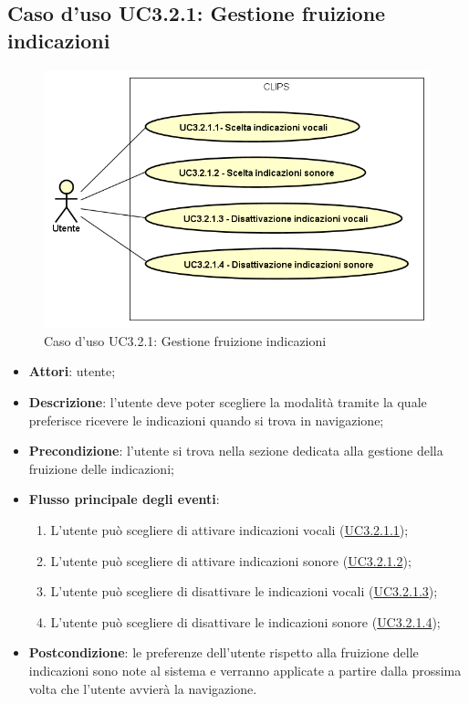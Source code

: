 \documentclass[../AnalisiDeiRequisiti.tex]{subfiles}
\begin{document}
\subsection{Caso d'uso UC3.2.1: Gestione fruizione indicazioni}

        \begin{figure}[H]
            \centering
            \includegraphics[scale=0.95, width=\textwidth]{img/UC3-2-1.png}
            \caption{Caso d'uso UC3.2.1: Gestione fruizione indicazioni}\label{fig:UC3.2.1} 
        \end{figure}
\begin{itemize}
\item \textbf{Attori}: utente;
\item \textbf{Descrizione}: l'utente deve poter scegliere la modalità tramite la quale preferisce ricevere le indicazioni quando si trova in navigazione; 
      \item \textbf{Precondizione}: l'utente si trova nella sezione dedicata alla gestione della fruizione delle indicazioni;

        \item \textbf{Flusso principale degli eventi}:
          \begin{enumerate}
          \item L'utente può scegliere di attivare indicazioni vocali (\hyperlink{UC3.2.1.1}{UC3.2.1.1});
          \item L'utente può scegliere di attivare indicazioni sonore (\hyperlink{UC3.2.1.2}{UC3.2.1.2});
          \item L'utente può scegliere di disattivare le indicazioni vocali (\hyperlink{UC3.2.1.3}{UC3.2.1.3});
          \item L'utente può scegliere di disattivare le indicazioni sonore (\hyperlink{UC3.2.1.4}{UC3.2.1.4});

      \end{enumerate}
    \item \textbf{Postcondizione}: le preferenze dell'utente rispetto alla fruizione delle indicazioni sono note al sistema e verranno applicate a partire dalla prossima volta che l'utente avvierà la navigazione.
  \end{itemize}
\hypertarget{UC3.2.1.1}{}
\end{document}
